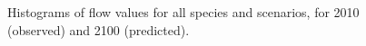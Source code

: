 {%
\begin{figure}[h!]
 \caption{Histograms of flow values for all species and scenarios, for 2010 (observed) and 2100 (predicted).}
 \label{fig:hist_2}
\end{figure}


}

